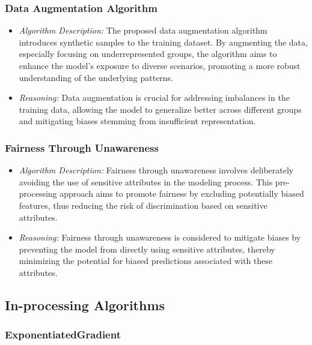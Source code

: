 \subsubsection{Data Augmentation Algorithm}

\begin{itemize}

    \item \emph{Algorithm Description:} The proposed data augmentation algorithm introduces synthetic samples to the training dataset. By augmenting the data, especially focusing on underrepresented groups, the algorithm aims to enhance the model's exposure to diverse scenarios, promoting a more robust understanding of the underlying patterns.

    \item \emph{Reasoning:} Data augmentation is crucial for addressing imbalances in the training data, allowing the model to generalize better across different groups and mitigating biases stemming from insufficient representation.

\end{itemize}

\subsubsection{Fairness Through Unawareness}

\begin{itemize}

    \item \emph{Algorithm Description:} Fairness through unawareness involves deliberately avoiding the use of sensitive attributes in the modeling process. This pre-processing approach aims to promote fairness by excluding potentially biased features, thus reducing the risk of discrimination based on sensitive attributes.

    \item \emph{Reasoning:} Fairness through unawareness is considered to mitigate biases by preventing the model from directly using sensitive attributes, thereby minimizing the potential for biased predictions associated with these attributes.

\end{itemize}

\subsection{In-processing Algorithms}

\subsubsection{ExponentiatedGradient}

